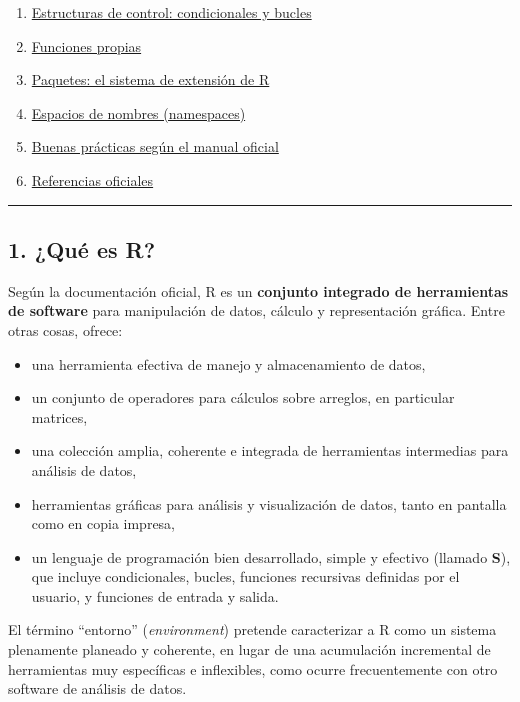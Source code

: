 \documentclass[
  jou,
  floatsintext,
  longtable,
  a4paper,
  nolmodern,
  notxfonts,
  notimes,
  12pt,
  colorlinks=true,linkcolor=blue,citecolor=blue,urlcolor=blue]{apa7}
\providecommand{\tightlist}{%
  \setlength{\itemsep}{0pt}\setlength{\parskip}{0pt}}
\begin{document}
\begin{enumerate}
\item
  \hyperref[20-estructuras-de-control-condicionales-y-bucles]{Estructuras
  de control: condicionales y bucles}
\item
  \hyperref[21-funciones-propias]{Funciones propias}
\item
  \hyperref[22-paquetes-el-sistema-de-extensiuxf3n-de-r]{Paquetes: el
  sistema de extensión de R}
\item
  \hyperref[23-espacios-de-nombres-namespaces]{Espacios de nombres
  (namespaces)}
\item
  \hyperref[24-buenas-pruxe1cticas-seguxfan-el-manual-oficial]{Buenas
  prácticas según el manual oficial}
\item
  \hyperref[25-referencias-oficiales]{Referencias oficiales}
\end{enumerate}

\begin{center}\rule{0.5\linewidth}{0.5pt}\end{center}

\subsection{1. ¿Qué es R?}\label{quuxe9-es-r}

Según la documentación oficial, R es un \textbf{conjunto integrado de
herramientas de software} para manipulación de datos, cálculo y
representación gráfica. Entre otras cosas, ofrece:

\begin{itemize}
\tightlist
\item
  una herramienta efectiva de manejo y almacenamiento de datos,
\item
  un conjunto de operadores para cálculos sobre arreglos, en particular
  matrices,
\item
  una colección amplia, coherente e integrada de herramientas
  intermedias para análisis de datos,
\item
  herramientas gráficas para análisis y visualización de datos, tanto en
  pantalla como en copia impresa,
\item
  un lenguaje de programación bien desarrollado, simple y efectivo
  (llamado \textbf{S}), que incluye condicionales, bucles, funciones
  recursivas definidas por el usuario, y funciones de entrada y salida.
\end{itemize}

El término ``entorno'' (\emph{environment}) pretende caracterizar a R
como un sistema plenamente planeado y coherente, en lugar de una
acumulación incremental de herramientas muy específicas e inflexibles,
como ocurre frecuentemente con otro software de análisis de datos.
\end{document}
